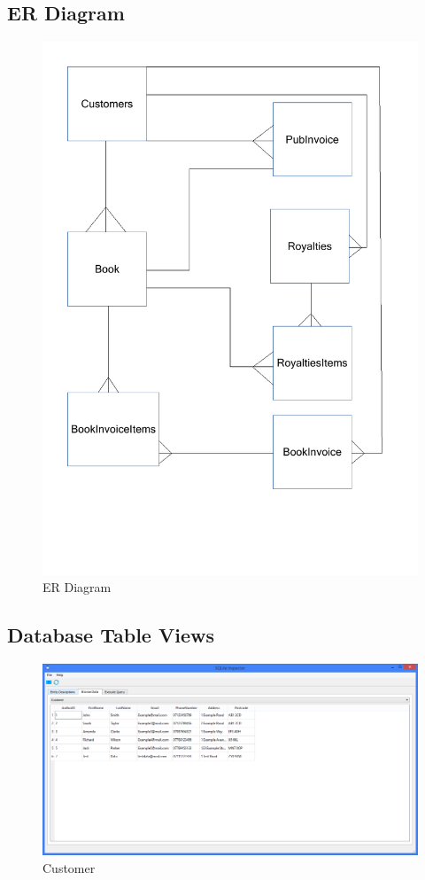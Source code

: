 \subsection{ER Diagram}

\begin{figure}[H]
    \caption{ER Diagram} \label{ER_Diagram.pdf}
    \includegraphics[width=\textwidth]{./Design/ER_Diagram.pdf}
\end{figure}

\subsection{Database Table Views}

\begin{figure}[H]
    \caption{Customer} \label{fig:Customer}
    \includegraphics[width=\textwidth]{./Maintenance/DatabaseTables/Customer.png}
\end{figure}

